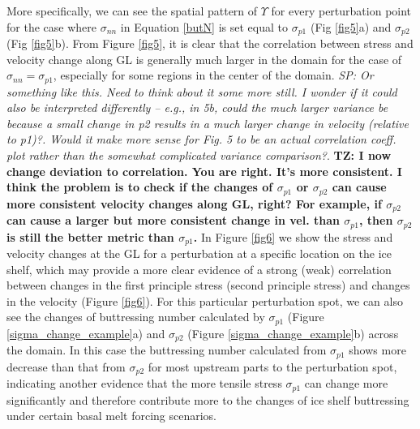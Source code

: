 \documentclass[review,oneside]{igs}
\begin{document}
More specifically, we can see the spatial pattern of $\Upsilon$ for every perturbation point for the case where $\sigma_{nn}$ in Equation \ref{butN} is set equal to $\sigma_{p1}$ (Fig \ref{fig5}a) and $\sigma_{p2}$ (Fig \ref{fig5}b). From Figure \ref{fig5}, it is clear that the correlation between stress and velocity change along GL is generally much larger in the domain for the case of $\sigma_{nn}=\sigma_{p1}$, especially for some regions in the center of the domain. \textit{SP: Or something like this. Need to think about it some more still. I wonder if it could also be interpreted differently -- e.g., in 5b, could the much larger variance be because a small change in p2 results in a much larger change in velocity (relative to p1)?. Would it make more sense for Fig. 5 to be an actual correlation coeff. plot rather than the somewhat complicated variance comparison?}. \textbf{TZ: I now change deviation to correlation. You are right. It's more consistent. I think the problem is to check if the changes of $\sigma_{p1}$ or $\sigma_{p2}$ can cause more consistent velocity changes along GL, right? For example, if $\sigma_{p2}$ can cause a larger but more consistent change in vel. than $\sigma_{p1}$, then $\sigma_{p2}$ is still the better metric than $\sigma_{p1}$.} In Figure \ref{fig6} we show the stress and velocity changes at the GL for a perturbation at a specific location on the ice shelf, which may provide a more clear evidence of a strong (weak) correlation between changes in the first principle stress (second principle stress) and changes in the velocity (Figure \ref{fig6}). For this particular perturbation spot, we can also see the changes of buttressing number calculated by $\sigma_{p1}$ (Figure \ref{sigma_change_example}a) and $\sigma_{p2}$ (Figure \ref{sigma_change_example}b) across the domain. In this case the buttressing number calculated from $\sigma_{p1}$ shows more decrease than that from $\sigma_{p2}$ for most upstream parts to the perturbation spot, indicating another evidence that the more tensile stress $\sigma_{p1}$ can change more significantly and therefore contribute more to the changes of ice shelf buttressing under certain basal melt forcing scenarios. 

\end{document}
